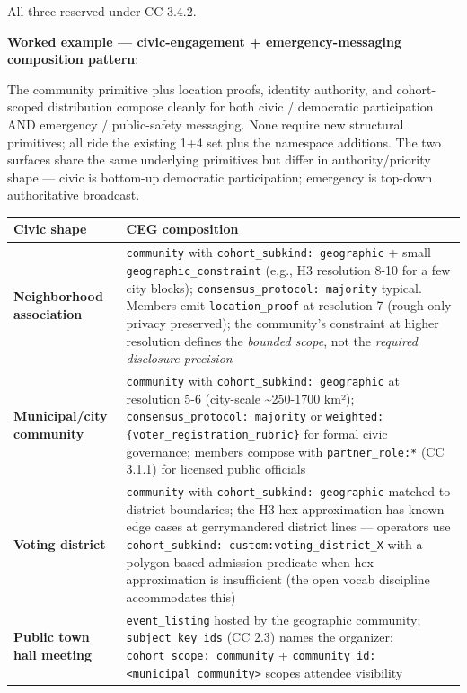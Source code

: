 \documentclass[11pt]{article}
\begin{document}
All three reserved under CC 3.4.2.



\textbf{Worked example — civic-engagement + emergency-messaging composition pattern}:


The community primitive plus location proofs, identity authority, and cohort-scoped distribution compose cleanly for both civic / democratic participation AND emergency / public-safety messaging. None require new structural primitives; all ride the existing 1+4 set plus the namespace additions. The two surfaces share the same underlying primitives but differ in authority/priority shape — civic is bottom-up democratic participation; emergency is top-down authoritative broadcast.


{\footnotesize
\begin{longtable}{|p{8.0cm}|p{8.0cm}|}\hline
\textbf{Civic shape} & \textbf{CEG composition} \\ \hline\endhead
\textbf{Neighborhood association} & \texttt{community} with \texttt{cohort\_subkind: geographic} + small \texttt{geographic\_constraint} (e.g., H3 resolution 8-10 for a few city blocks); \texttt{consensus\_protocol: majority} typical. Members emit \texttt{location\_proof} at resolution 7 (rough-only privacy preserved); the community's constraint at higher resolution defines the \textit{bounded scope}, not the \textit{required disclosure precision} \\ \hline
\textbf{Municipal/city community} & \texttt{community} with \texttt{cohort\_subkind: geographic} at resolution 5-6 (city-scale \textasciitilde{}250-1700 km²); \texttt{consensus\_protocol: majority} or \texttt{weighted:\{voter\_registration\_rubric\}} for formal civic governance; members compose with \texttt{partner\_role:*} (CC 3.1.1) for licensed public officials \\ \hline
\textbf{Voting district} & \texttt{community} with \texttt{cohort\_subkind: geographic} matched to district boundaries; the H3 hex approximation has known edge cases at gerrymandered district lines — operators use \texttt{cohort\_subkind: custom:voting\_district\_X} with a polygon-based admission predicate when hex approximation is insufficient (the open vocab discipline accommodates this) \\ \hline
\textbf{Public town hall meeting} & \texttt{event\_listing} hosted by the geographic community; \texttt{subject\_key\_ids} (CC 2.3) names the organizer; \texttt{cohort\_scope: community} + \texttt{community\_id: <municipal\_community>} scopes attendee visibility \\ \hline

\end{longtable}}
\end{document}

